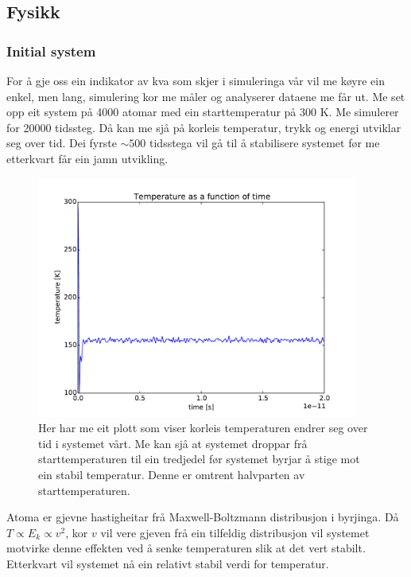 \documentclass[12pt, a4paper]{article}
\theoremstyle{definition} \newtheorem*{definition}{Teorem}
\begin{document}
    \subsection*{Fysikk}

        \subsubsection*{Initial system}
            For å gje oss ein indikator av kva som skjer i simuleringa vår vil me køyre ein enkel, men lang, simulering kor me måler og analyserer dataene me får ut.
            Me set opp eit system på 4000 atomar med ein starttemperatur på 300 K. Me simulerer for 20000 tidssteg.
            Då kan me sjå på korleis temperatur, trykk og energi utviklar seg over tid. Dei fyrste $\sim 500$ tidsstega vil gå til å stabilisere systemet før me 
            etterkvart får ein jamn utvikling.
            \begin{figure}[H]
                \centering
                \includegraphics[width=400px]{temperature.pdf}
                \caption{Her har me eit plott som viser korleis temperaturen endrer seg over tid i systemet vårt. Me kan sjå at systemet droppar frå starttemperaturen til
                         ein tredjedel før systemet byrjar å stige mot ein stabil temperatur. Denne er omtrent halvparten av starttemperaturen.}
            \end{figure}
            Atoma er gjevne hastigheitar frå Maxwell-Boltzmann distribusjon i byrjinga. Då $T \propto E_k \propto v^2$, kor $v$ vil vere gjeven frå ein tilfeldig distribusjon
            vil systemet motvirke denne effekten ved å senke temperaturen slik at det vert stabilt. Etterkvart vil systemet nå ein relativt stabil verdi for temperatur. 
\end{document}
